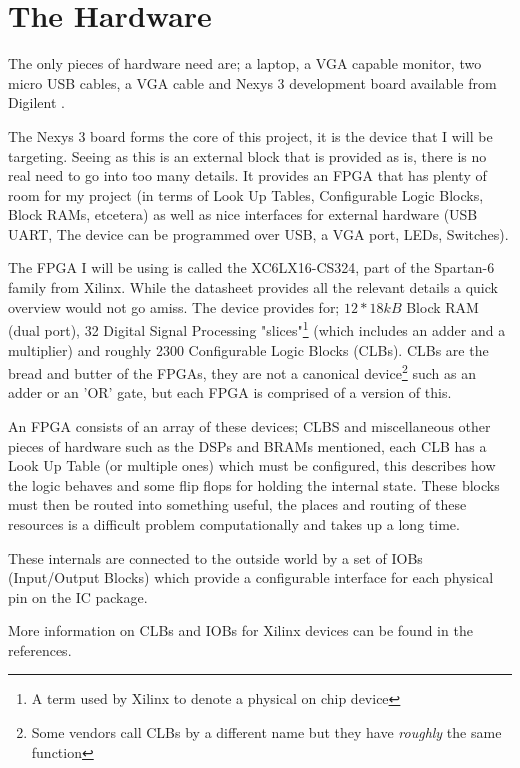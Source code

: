 \documentclass	[a4paper, 10pt]	{article}
\begin{document}
  \section{The Hardware}

  The only pieces of hardware need are; a laptop, a VGA capable monitor, two micro USB cables,
  a VGA cable and Nexys 3 development board available from Digilent \cite{nexysDigilent}.

  The Nexys 3 board forms the core of this project, it is the device that I will be targeting.
  Seeing as this is an external block that is provided as is, there is no real need to go into
  too many details. It provides an FPGA that has plenty of room for my project (in terms of
  Look Up Tables, Configurable Logic Blocks, Block RAMs, etcetera) as well as nice interfaces
  for external hardware (USB UART, The device can be programmed over USB, a VGA port, LEDs,
  Switches).

  The FPGA I will be using is called the XC6LX16-CS324, part of
  the Spartan-6 family from Xilinx\cite{xilinxDataSheet}. While the
  datasheet provides all the relevant details a quick overview would
  not go amiss. The device provides for; $12*18kB$ Block RAM (dual
  port), 32 Digital Signal Processing "slices"\footnote{A term used
  by Xilinx to denote a physical on chip device} (which includes an
  adder and a multiplier) and roughly 2300 Configurable Logic Blocks
  (CLBs). CLBs are the bread and butter of the FPGAs, they are not a
  canonical device\footnote{Some vendors call CLBs by a different name
  but they have \emph{roughly} the same function} such as an adder or an
  'OR' gate, but each FPGA is comprised of a version of this.

  An FPGA consists of an array of these devices; CLBS and miscellaneous
  other pieces of hardware such as the DSPs and BRAMs mentioned, each
  CLB has a Look Up Table (or multiple ones) which must be configured,
  this describes how the logic behaves and some flip flops for holding
  the internal state. These blocks must then be routed into something
  useful, the places and routing of these resources is a difficult
  problem computationally and takes up a long time.

  These internals are connected to the outside world by a set of IOBs
  (Input/Output Blocks) which provide a configurable interface for each
  physical pin on the IC package.

  More information on CLBs and IOBs for Xilinx devices can be found in
  the references\cite{CLB1}.
\end{document}
